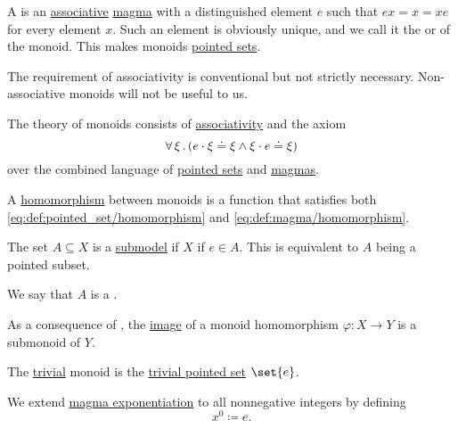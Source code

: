 \begin{definition}\label{def:monoid}
  A  is an \hyperref[eq:def:magma/associative]{associative} \hyperref[def:magma]{magma} with a distinguished element \( e \) such that \( ex = x = xe \) for every element \( x \). Such an element is obviously unique, and we call it the  or  of the monoid. This makes monoids \hyperref[def:pointed_set]{pointed sets}.

  The requirement of associativity is conventional but not strictly necessary. Non-associative monoids will not be useful to us.

  \begin{thmenum}
     The theory of monoids consists of \hyperref[eq:def:magma/associative]{associativity} and the axiom
    \begin{equation}\label{eq:def:monoid/theory/identity}
      \forall \thinspace \xi \thinspace . \thinspace (e \cdot \xi \doteq \xi \wedge \xi \cdot e \doteq \xi)
    \end{equation}
    over the combined language of \hyperref[def:pointed_set/theory]{pointed sets} and \hyperref[def:magma/theory]{magmas}.

     A \hyperref[def:first_order_homomorphism]{homomorphism} between monoids is a function that satisfies both \eqref{eq:def:pointed_set/homomorphism} and \eqref{eq:def:magma/homomorphism}.

     The set \( A \subseteq X \) is a \hyperref[thm:substructure_is_model]{submodel} if \( X \) if \( e \in A \). This is equivalent to \( A \) being a pointed subset.

    We say that \( A \) is a .

    As a consequence of , the \hyperref[def:multi_valued_function/image]{image} of a monoid homomorphism \( \varphi: X \to Y \) is a submonoid of \( Y \).

     The \hyperref[thm:substructures_form_complete_lattice/bottom]{trivial} monoid is the \hyperref[def:pointed_set/trivial]{trivial pointed set} \( \set{ e } \).

     We extend \hyperref[def:magma/exponentiation]{magma exponentiation} to all nonnegative integers by defining
    \begin{equation*}
      x^0 \coloneqq e.
    \end{equation*}


\end{thmenum}
\end{definition}
